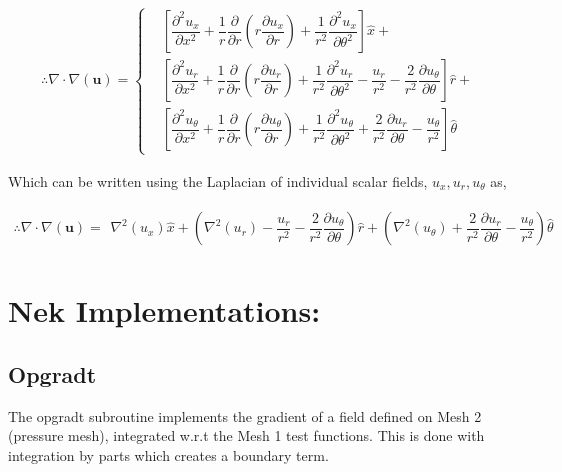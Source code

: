 \documentclass{kthreport}
\begin{document}
\begin{eqnarray}
	\therefore \nabla\cdot\nabla (\bm{u}) = \left\{
	\begin{split}
		& \left[\dfrac{\partial^{2}u_{x}}{\partial x^{2}} + \dfrac{1}{r}\dfrac{\partial }{\partial r}\left(r\dfrac{\partial u_{x}}{\partial r}\right) +  \dfrac{1}{r^{2}}\dfrac{\partial^{2} u_{x}}{\partial \theta^{2}}	\right]\hat{x} + \\
		& \left[\dfrac{\partial^{2}u_{r}}{\partial x^{2}} + \dfrac{1}{r}\dfrac{\partial }{\partial r}\left(r\dfrac{\partial u_{r}}{\partial r}\right) +\dfrac{1}{r^{2}}\dfrac{\partial^{2} u_{r}}{\partial \theta^{2}} - \dfrac{u_{r}}{r^{2}} - \dfrac{2}{r^{2}}\dfrac{\partial u_{\theta}}{\partial \theta}  \right]\hat{r}  +\\
		& \left[\dfrac{\partial^{2}u_{\theta}}{\partial x^{2}} + \dfrac{1}{r}\dfrac{\partial }{\partial r}\left(r\dfrac{\partial u_{\theta}}{\partial r}\right) + \dfrac{1}{r^{2}}\dfrac{\partial^{2} u_{\theta}}{\partial \theta^{2}} + \dfrac{2}{r^{2}}\dfrac{\partial u_{r}}{\partial \theta}   - \dfrac{u_{\theta}}{r^{2}} \right]\hat{\theta}  
	\end{split}\right. \label{eqn:vector_laplacian}
\end{eqnarray}

Which can be written using the Laplacian of individual scalar fields, $u_{x},u_{r},u_{\theta}$ as,

\begin{eqnarray}
	\therefore \nabla\cdot\nabla (\bm{u}) = 
\begin{split}
	 \nabla^{2}(u_{x}) \hat{x} + \left(\nabla^{2}(u_{r}) - \dfrac{u_{r}}{r^{2}} - \dfrac{2}{r^{2}}\dfrac{\partial u_{\theta}}{\partial \theta}  \right)\hat{r}  + 
	 \left( \nabla^{2}(u_{\theta}) + \dfrac{2}{r^{2}}\dfrac{\partial u_{r}}{\partial \theta}   - \dfrac{u_{\theta}}{r^{2}} \right)\hat{\theta}  
\end{split} \label{eqn:vector_laplacian_scalar}
\end{eqnarray}

\section{Nek Implementations:}

\subsection{Opgradt}

The opgradt subroutine implements the gradient of a field defined on Mesh 2 (pressure mesh), integrated w.r.t the Mesh 1 test functions.
This is done with integration by parts which creates a boundary term.
\end{document}
